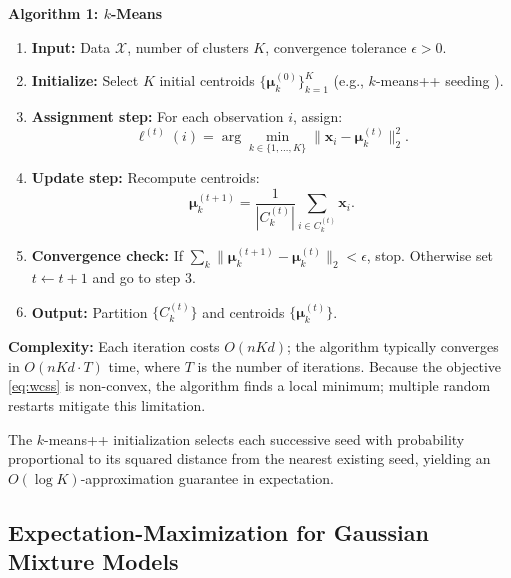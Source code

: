 \documentclass[conference]{IEEEtran}
\begin{document}
\textbf{Algorithm 1: $k$-Means}
\begin{enumerate}
    \item \textbf{Input:} Data $\mathcal{X}$, number of clusters $K$, convergence tolerance $\epsilon > 0$.
    \item \textbf{Initialize:} Select $K$ initial centroids $\{\boldsymbol{\mu}_k^{(0)}\}_{k=1}^K$ (e.g., $k$-means++ seeding \cite{arthur2007k}).
    \item \textbf{Assignment step:} For each observation $i$, assign:
    \[
    \ell^{(t)}(i) = \arg\min_{k \in \{1,\ldots,K\}} \|\mathbf{x}_i - \boldsymbol{\mu}_k^{(t)}\|_2^2.
    \]
    \item \textbf{Update step:} Recompute centroids:
    \[
    \boldsymbol{\mu}_k^{(t+1)} = \frac{1}{|C_k^{(t)}|}\sum_{i \in C_k^{(t)}} \mathbf{x}_i.
    \]
    \item \textbf{Convergence check:} If $\sum_k \|\boldsymbol{\mu}_k^{(t+1)} - \boldsymbol{\mu}_k^{(t)}\|_2 < \epsilon$, stop. Otherwise set $t \leftarrow t+1$ and go to step 3.
    \item \textbf{Output:} Partition $\{C_k^{(t)}\}$ and centroids $\{\boldsymbol{\mu}_k^{(t)}\}$.
\end{enumerate}

\textbf{Complexity:} Each iteration costs $O(nKd)$; the algorithm typically converges in $O(nKd \cdot T)$ time, where $T$ is the number of iterations. Because the objective \eqref{eq:wcss} is non-convex, the algorithm finds a local minimum; multiple random restarts mitigate this limitation.

The $k$-means++ initialization \cite{arthur2007k} selects each successive seed with probability proportional to its squared distance from the nearest existing seed, yielding an $O(\log K)$-approximation guarantee in expectation.

\subsection{Expectation-Maximization for Gaussian Mixture Models}
\end{document}
